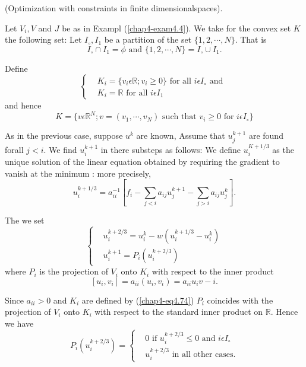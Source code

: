 \begin{example}\label{chap4-exam4.5}
(Optimization with constraints in finite dimensional\break spaces).

Let $V_{i}, V$ and $J$ be as in Exampl (\ref{chap4-exam4.4}). We take for the convex set $K$ the following set: Let $I_{\circ}, I_{1}$ be a partition of the set $\{1, 2, \cdots, N\}$. That is 
$$
I_{\circ} \cap I_{1} = \phi \text{ and } \{1, 2, \cdots , N\} = I_{\circ} \cup I_{1}.
$$
\end{example}

Define
\begin{equation*}
\begin{cases}
& K_{i} = \{v_{i} \epsilon \mathbb{R}; v_{i} \geq 0\} \text{ for all } i \epsilon I_{\circ} \text{ and }\\
& K_{i} = \mathbb{R} \text{ for all } i \epsilon I_{1}\tag{4.77}\label{chap4-eq4.77} 
\end{cases}
\end{equation*}
and hence
\begin{equation*}
K = \{v \epsilon \mathbb{R}^{N} ; v = (v_{1}, \cdots , v_{N}) \text{ such that } v_{i} \geq 0 \text{ for } i \epsilon I_{\circ}\}\tag{4.78}\label{chap4-eq4.78}
\end{equation*}

As in the previous case, suppose $u^{k}$ are known, Assume that $u_{j}^{k+1}$ are found for\pageoriginale all $j < i$. We find $u_{i}^{k+1}$ in there substeps as follows: We define $u_{i}^{K+1/3}$ as the unique solution of the linear equation obtained by requiring the gradient to vanish at the minimum : more precisely,
\begin{equation*}
u_{i}^{k+1/3} = a_{ii}^{-1} [f_{i} - \sum_{j<i} a_{ij} u_{j}^{k+1} - \sum_{j>i} a_{ij} u_{j}^{k}].\tag{4.79}\label{chap4-eq4.79}
\end{equation*}

The we set
\begin{equation*}
\begin{cases}
& u_{i}^{k+2/3} = u_{i}^{k} - w (u_{i}^{k+1/3} - u_{i}^{k})\\
& u_{i}^{k+1} = P_{i} (u_{i}^{k+2/3})\tag{4.80}\label{chap4-eq4.80}
\end{cases}
\end{equation*}
where $P_{i}$ is the projection of $V_{i}$ onto $K_{i}$ with  respect to the inner product
$$
[u_{i}, v_{i}] = a_{ii} (u_{i}, v_{i}) = a_{ii} u_{i} v-{i}. 
$$

Since $a_{ii} > 0$ and $K_{i}$ are defined by (\ref{chap4-eq4.74}) $P_{i}$ coincides with the projection of $V_{i}$ onto $K_{i}$ with respect to the standard inner product on $\mathbb{R}$. Hence we have
\begin{equation*}
P_{i}(u_{i}^{k+2/3}) = 
\begin{cases}
& 0 \text{ if } u_{i}^{k+2/3} \leq 0 \text{ and } i \epsilon I_{\circ}\\
& u_{i}^{k+2/3} \text{ in all other cases} .\tag{4.81}\label{chap4-eq4.81}
\end{cases}
\end{equation*}

